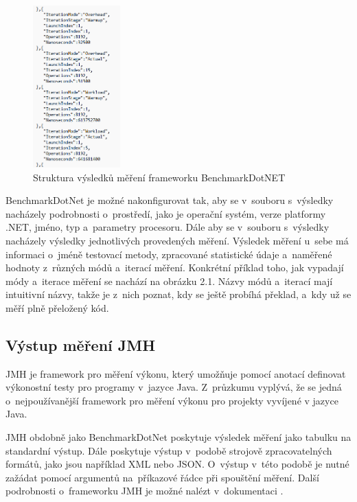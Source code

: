 \begin{figure}[!ht]
    \centering
    \includegraphics[width=0.3\textwidth]{../img/BenchmarkDotNET-modes.png}
    \caption{Struktura výsledků měření frameworku BenchmarkDotNET}
\end{figure}

BenchmarkDotNet je možné nakonfigurovat tak, aby se v~souboru s~výsledky nacházely podrobnosti o~prostředí, jako je operační systém,
verze platformy .NET, jméno, typ a~parametry procesoru. Dále aby se v~souboru s~výsledky nacházely
výsledky jednotlivých provedených měření. Výsledek měření u~sebe má informaci o~jméně
testovací metody, zpracované statistické údaje a~naměřené hodnoty z~různých módů a~iterací měření.
Konkrétní příklad toho, jak vypadají módy a~iterace měření se nachází na obrázku 2.1.
Názvy módů a~iterací mají intuitivní názvy, takže je z~nich poznat, kdy se ještě probíhá
překlad, a~kdy už se měří plně přeložený kód.

\subsection{Výstup měření JMH}

JMH je framework pro měření výkonu, který umožňuje pomocí anotací definovat výkonostní testy
pro programy v~jazyce Java. Z~průzkumu \cite[]{unitTestingPerformanceSurvey} vyplývá, že se jedná o~nejpoužívanější framework
pro měření výkonu pro projekty vyvíjené v jazyce Java.

JMH obdobně jako BenchmarkDotNet poskytuje výsledek měření jako tabulku na standardní výstup.
Dále poskytuje výstup v~podobě strojově zpracovatelných formátů, jako jsou například XML
nebo JSON. O~výstup v~této podobě je nutné zažádat pomocí argumentů na~příkazové řádce při
spouštění měření. Další podrobnosti o~frameworku JMH je možné nalézt v~dokumentaci \cite[]{jmh}.

